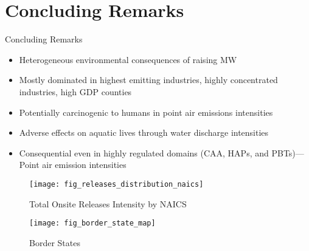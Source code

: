 \documentclass[aspectratio = 169]{beamer}
\begin{document}
    \section{Concluding Remarks}\label{sec:concluding-remarks}
    \begin{frame}{Concluding Remarks}
        \begin{itemize}
            \item Heterogeneous environmental consequences of raising MW
            \item Mostly dominated in highest emitting industries, highly concentrated industries, high GDP counties
            \item Potentially carcinogenic to humans in point air emissions intensities
            \item Adverse effects on aquatic lives through water discharge intensities
            \item Consequential even in highly regulated domains (CAA, HAPs, and PBTs)---Point air emission intensities
        \end{itemize}
    \end{frame}
    \begin{frame}
        \hypertarget{fig:distribution-releases-intensity}{}
        \begin{figure}
            \centering
            \texttt{[image: fig\_releases\_distribution\_naics]}
            \caption{Total Onsite Releases Intensity by NAICS}
            \label{fig:distribution-releases-intensity}
        \end{figure}
        \hyperlink{Distribution Releases Intensity}{}
        \fontsize{9}{11}\selectfont
    \end{frame}

    \begin{frame}
        \hypertarget{fig:border-states}{}
        \begin{figure}
            \centering
            \texttt{[image: fig\_border\_state\_map]}
            \caption{Border States}
            \label{fig:border-state-map}
        \end{figure}
        \hyperlink{Border States}{}
        \fontsize{9}{11}\selectfont
    \end{frame}
\end{document}
